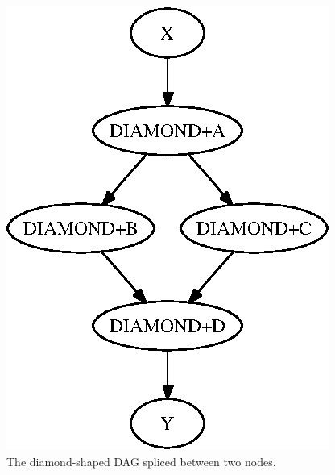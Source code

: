 \begin{figure}
\centering
\includegraphics{user-man/splice-simple}




\caption{\label{fig:dagman-splice-simple} The diamond-shaped DAG spliced between two nodes.}
\end{figure}

